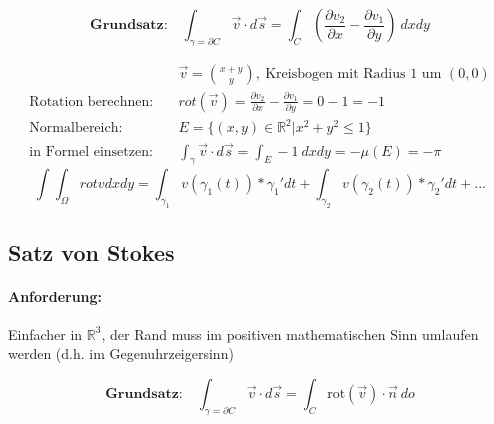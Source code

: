 \documentclass[11pt]{article}
\begin{document}
\begin{equation*}
	\textbf{Grundsatz:}\quad\int_{\gamma = \partial C} \vec{v} \cdot d\vec{s} = \int_C (\frac{\partial v_2}{\partial x}-\frac{\partial v_1}{\partial y})\ dxdy
\end{equation*}

\begin{equation*}
\begin{split}
	& \vec{v} = \binom{x+y}{y},\ \text{Kreisbogen mit Radius $1$ um $(0,0)$} \\
	\text{Rotation berechnen:}\quad & rot(\vec{v}) = \frac{\partial v_2}{\partial x}-\frac{\partial v_1}{\partial y} = 0 -1 = -1 \\
	\text{Normalbereich:}\quad & E = \{(x,y) \in \mathbb{R}^2 | x^2 + y^2 \leq 1 \} \\
	\text{in Formel einsetzen:}\quad & \int_\gamma \vec{v} \cdot d\vec{s} = \int_E -1\ dxdy = -\mu(E) = -\pi
\end{split}
\end{equation*}
\begin{equation}
	\int\int_{\Omega}rotvdxdy=\int_{\gamma_1}v(\gamma_1(t))*\gamma_1'dt+\int_{\gamma_2}v(\gamma_2(t))*\gamma_2'dt+...
\end{equation}

\subsection{Satz von Stokes}

\paragraph{Anforderung:} Einfacher in $\mathbb{R}^3$, der Rand muss im positiven mathematischen Sinn umlaufen werden (d.h. im Gegenuhrzeigersinn)

\begin{equation*}
	\textbf{Grundsatz:}\quad\int_{\gamma = \partial C} \vec{v} \cdot d\vec{s} = \int_C \text{rot}(\vec{v}) \cdot \vec{n}\ do
\end{equation*}
\end{document}
